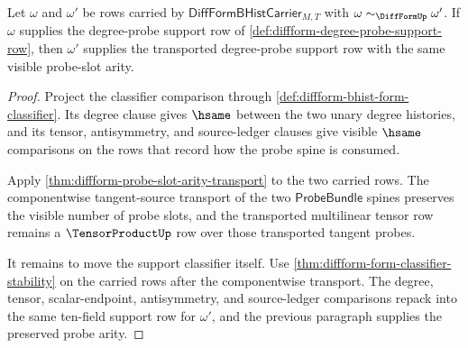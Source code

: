 \begin{theorem}
\label{thm:diffform-degree-probe-transport}
Let $\omega$ and $\omega'$ be rows carried by
$\mathsf{DiffFormBHistCarrier}_{M,T}$ with
$\omega\sim_{\DiffFormUp}\omega'$. If $\omega$ supplies the degree-probe
support row of \autoref{def:diffform-degree-probe-support-row}, then
$\omega'$ supplies the transported degree-probe support row with the same
visible probe-slot arity.
\end{theorem}
\begin{proof}
Project the classifier comparison through
\autoref{def:diffform-bhist-form-classifier}. Its degree clause gives
$\hsame$ between the two unary degree histories, and its tensor, antisymmetry,
and source-ledger clauses give visible $\hsame$ comparisons on the rows that
record how the probe spine is consumed.

Apply \autoref{thm:diffform-probe-slot-arity-transport} to the two carried
rows. The componentwise tangent-source transport of the two
$\mathsf{ProbeBundle}$ spines preserves the visible number of probe slots,
and the transported multilinear tensor row remains a $\TensorProductUp$ row
over those transported tangent probes.

It remains to move the support classifier itself. Use
\autoref{thm:diffform-form-classifier-stability} on the carried rows after
the componentwise transport. The degree, tensor, scalar-endpoint,
antisymmetry, and source-ledger comparisons repack into the same ten-field
support row for $\omega'$, and the previous paragraph supplies the preserved
probe arity.
\end{proof}

